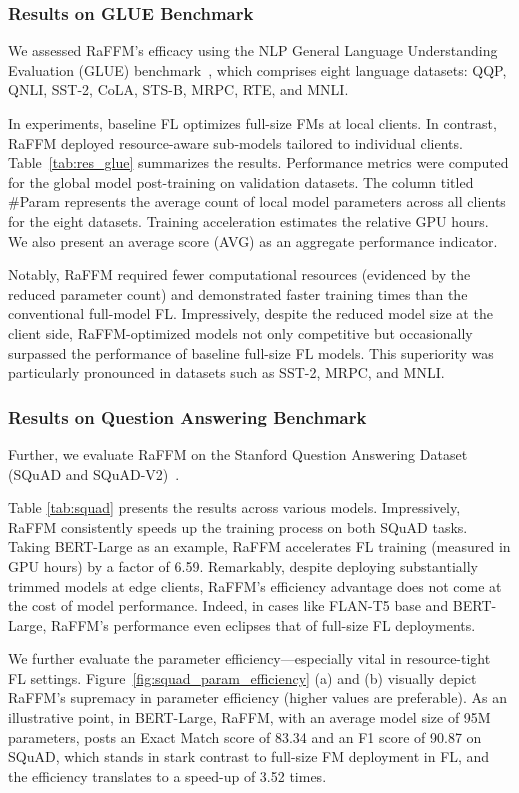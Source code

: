 \subsubsection{Results on GLUE Benchmark}
We assessed RaFFM's efficacy using the NLP General Language Understanding Evaluation (GLUE) benchmark~\citep{wang2018glue}, which comprises eight language datasets: QQP, QNLI, SST-2, CoLA, STS-B, MRPC, RTE, and MNLI.

In experiments, baseline FL optimizes full-size FMs at local clients. In contrast, RaFFM deployed resource-aware sub-models tailored to individual clients. Table~\ref{tab:res_glue} summarizes the results. Performance metrics were computed for the global model post-training on validation datasets. The column titled \#Param represents the average count of local model parameters across all clients for the eight datasets. Training acceleration estimates the relative GPU hours. We also present an average score (AVG) as an aggregate performance indicator.

Notably, RaFFM required fewer computational resources (evidenced by the reduced parameter count) and demonstrated faster training times than the conventional full-model FL. Impressively, despite the reduced model size at the client side, RaFFM-optimized models not only competitive but occasionally surpassed the performance of baseline full-size FL models. This superiority was particularly pronounced in datasets such as SST-2, MRPC, and MNLI.



\subsubsection{Results on Question Answering Benchmark}

Further, we evaluate RaFFM on the Stanford Question Answering Dataset (SQuAD and SQuAD-V2)~\citep{Rajpurkar2016squad}. 

Table \ref{tab:squad} presents the results across various models. Impressively, RaFFM consistently speeds up the training process on both SQuAD tasks. Taking BERT-Large as an example, RaFFM accelerates FL training (measured in GPU hours) by a factor of 6.59. Remarkably, despite deploying substantially trimmed models at edge clients, RaFFM's efficiency advantage does not come at the cost of model performance. Indeed, in cases like FLAN-T5 base and BERT-Large, RaFFM's performance even eclipses that of full-size FL deployments.

We further evaluate the parameter efficiency—especially vital in resource-tight FL settings. Figure~\ref{fig:squad_param_efficiency} (a) and (b) visually depict RaFFM's supremacy in parameter efficiency (higher values are preferable). As an illustrative point, in BERT-Large, RaFFM, with an average model size of 95M parameters, posts an Exact Match score of 83.34 and an F1 score of 90.87 on SQuAD, which stands in stark contrast to full-size FM deployment in FL, and the efficiency translates to a speed-up of 3.52 times.

